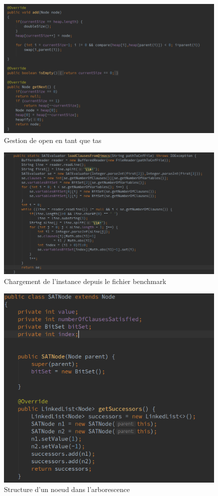 \begin{figure}[H]
	\centering
	\includegraphics[width=\textwidth]{images/imgs/heapStorage.png}
	\caption{Gestion de open en tant que tas}
\end{figure}

\begin{figure}[H]
	\centering
	\includegraphics[width=\textwidth]{images/imgs/loadFromDimacs.png}
	\caption{Chargement de l'instance depuis le fichier benchmark}
\end{figure}

\begin{figure}[H]
	\centering
	\includegraphics[width=\textwidth]{images/imgs/nodeStruct.png}
	\caption{Structure d'un noeud dans l'arborescence}
\end{figure}